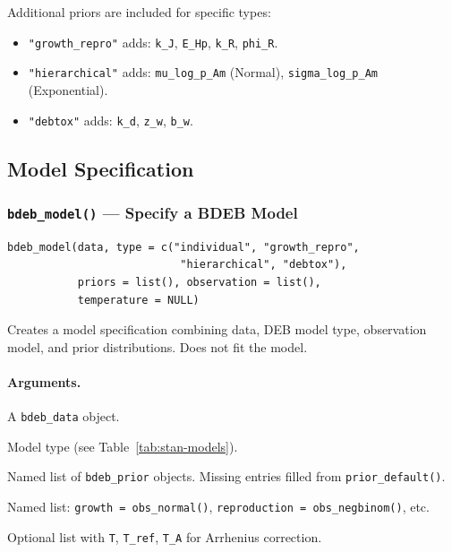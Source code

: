 \documentclass[11pt,a4paper]{article}
\newcommand{\fn}[1]{\texttt{#1()}}
\newcommand{\code}[1]{\texttt{#1}}
\begin{document}
Additional priors are included for specific types:
\begin{itemize}[nosep]
  \item \code{"growth\_repro"} adds: \code{k\_J}, \code{E\_Hp}, \code{k\_R}, \code{phi\_R}.
  \item \code{"hierarchical"} adds: \code{mu\_log\_p\_Am} (Normal), \code{sigma\_log\_p\_Am} (Exponential).
  \item \code{"debtox"} adds: \code{k\_d}, \code{z\_w}, \code{b\_w}.
\end{itemize}

\subsection{Model Specification}

\subsubsection{\fn{bdeb\_model} --- Specify a BDEB Model}

\begin{lstlisting}
bdeb_model(data, type = c("individual", "growth_repro",
                           "hierarchical", "debtox"),
           priors = list(), observation = list(),
           temperature = NULL)
\end{lstlisting}

Creates a model specification combining data, DEB model type, observation
model, and prior distributions.  Does not fit the model.

\paragraph{Arguments.}
\begin{description}[nosep,leftmargin=3.5cm,style=nextline]
  \item[\code{data}] A \code{bdeb\_data} object.
  \item[\code{type}] Model type (see Table~\ref{tab:stan-models}).
  \item[\code{priors}] Named list of \code{bdeb\_prior} objects.  Missing entries filled from \fn{prior\_default}.
  \item[\code{observation}] Named list: \code{growth = obs\_normal()}, \code{reproduction = obs\_negbinom()}, etc.
  \item[\code{temperature}] Optional list with \code{T}, \code{T\_ref}, \code{T\_A} for Arrhenius correction.
\end{description}
\end{document}
